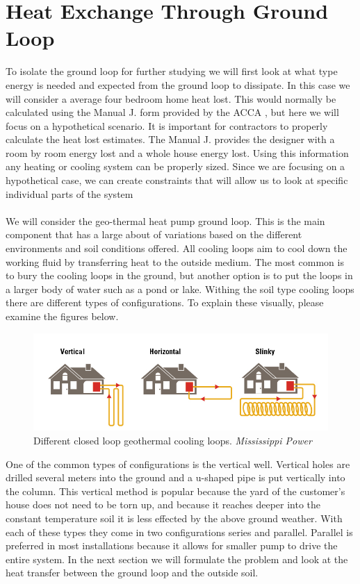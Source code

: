 \section{Heat Exchange Through Ground Loop}
To isolate the ground loop for further studying we will first look at what type energy is needed and expected from the ground loop to dissipate. In this case we will consider a average four bedroom home heat lost. This would normally be calculated using the Manual J. form provided by the ACCA \cite{ACCAManualJ}, but here we will focus on a hypothetical scenario. It is important for contractors to properly calculate the heat lost estimates. The Manual J. provides the designer with a room by room energy lost and a whole house energy lost. Using this information any heating or cooling system can be properly sized. Since we are focusing on a hypothetical case, we can create constraints that will allow us to look at specific individual parts of the system \\ \\
%
We will consider the geo-thermal heat pump ground loop. This is the main component that has a large about of variations based on the different environments and soil conditions offered. All cooling loops aim to cool down the working fluid by transferring heat to the outside medium. The most common is to bury the cooling loops in the ground, but another option is to put the loops in a larger body of water such as a pond or lake. Withing the soil type cooling loops there are different types of configurations. To explain these visually, please examine the figures below.
%
\begin{figure}[H]
    \centering
    \includegraphics[width=6in]{pictures/GroundLoops.png}
    \caption{Different closed loop geothermal cooling loops. \textit{Mississippi Power \cite{GCHP}}}
\end{figure}
%
\noindent
One of the common types of configurations is the vertical well. Vertical holes are drilled several meters into the ground and a u-shaped pipe is put vertically into the column. This vertical method is popular because the yard of the customer's house does not need to be torn up, and because it reaches deeper into the constant temperature soil it is less effected by the above ground weather. With each of these types they come in two configurations series and parallel. Parallel is preferred in most installations because it allows for smaller pump to drive the entire system. In the next section we will formulate the problem and look at the heat transfer between the ground loop and the outside soil.